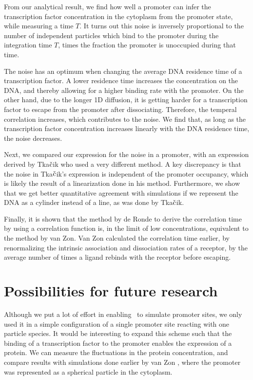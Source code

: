 From our analytical result, we find how well a promoter can infer the transcription factor concentration in the cytoplasm from the promoter state, while measuring a time $T$. It turns out this noise is inversely proportional to the number of independent particles which bind to the promoter during the integration time $T$, times the fraction the promoter is unoccupied during that time.

The noise has an optimum when changing the average DNA residence time of a transcription factor. A lower residence time increases the concentration on the DNA, and thereby allowing for a higher binding rate with the promoter. On the other hand, due to the longer 1D diffusion, it is getting harder for a transcription factor to escape from the promoter after dissociating. Therefore, the temperal correlation increases, which contributes to the noise. We find that, as long as the transcription factor concentration increases linearly with the DNA residence time, the noise decreases.

Next, we compared our expression for the noise in a promoter, with an expression derived by Tka$\check{\rm c}$ik who used a very different method. A key discrepancy is that the noise in Tka$\check{\rm c}$ik's expression is independent of the promoter occupancy, which is likely the result of a linearization done in his method. Furthermore, we show that we get better quantitative agreement with simulations if we represent the DNA as a cylinder instead of a line, as was done by Tka$\check{\rm c}$ik.

Finally, it is shown that the method by de Ronde to derive the correlation time by using a correlation function is, in the limit of low concentrations, equivalent to the method by van Zon. Van Zon calculated the correlation time earlier, by renormalizing the intrinsic association and dissociation rates of a receptor, by the average number of times a ligand rebinds with the receptor before escaping.

\newpage

\section{Possibilities for future research}
Although we put a lot of effort in enabling \GFRD\, to simulate promoter sites, we only used it in a simple configuration of a single promoter site reacting with one particle species. It would be interesting to expand this scheme such that the binding of a transcription factor to the promoter enables the expression of a protein. We can measure the fluctuations in the protein concentration, and compare results with simulations done earlier by van Zon \cite{VanZon2006}, where the promoter was represented as a spherical particle in the cytoplasm. 

